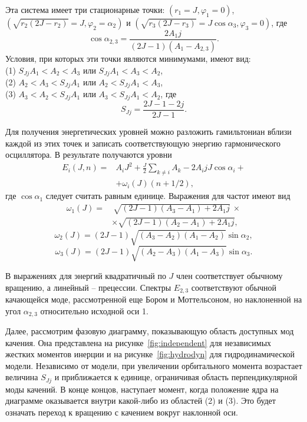 \documentclass[a4paper, 10pt, twocolumn]{article}
\let\phi\varphi
\begin{document}
Эта система имеет три стационарные точки: $(r_1 = J, \phi_1 = 0)$,
$(\sqrt{r_2(2J - r_2)} = J, \phi_2 = \alpha_2)$
и $(\sqrt{r_3(2J-r_3)} = J\cos\alpha_3, \phi_3 = 0)$, где
$$\cos\alpha_{2,3} = \frac{2A_1j}{(2J-1)(A_1 - A_{2,3})}.$$
Условия, при которых эти точки являются минимумами, имеют вид:
\def\SJj{S_{Jj}}
\\ (1) $\SJj A_1 < A_2 < A_3$ или $\SJj A_1 < A_3 < A_2$,
\\ (2) $A_2 < A_3 < \SJj A_1$ или $A_2 < \SJj A_1 < A_3$,
\\ (3) $A_3 < A_2 < \SJj A_1$ или $A_3 < \SJj A_1 < A_2$,
где
$$ \SJj = \frac{2J - 1 - 2j}{2J - 1}.$$

Для получения энергетических уровней можно разложить гамильтониан вблизи 
каждой из этих точек и записать соответствующую энергию гармонического 
осциллятора. В результате получаются уровни
$$\begin{aligned}
	E_i(J, n) =& A_i J^2 + \frac{J}{2}\sum_{k\neq i} A_k - 2A_i jJ \cos\alpha_i + \\
	& + \omega_i(J) (n + 1/2),
\end{aligned}$$
где $\cos\alpha_1$ следует считать равным единице. Выражения для частот 
имеют вид
$$\begin{aligned}
	\omega_1(J) =&\ \sqrt{(2J - 1)(A_3 - A_1) + 2A_1j}\ \times \\
	& \times \sqrt{(2J - 1)(A_2 - A_1) + 2A_1 j},
\end{aligned}$$
$$ \omega_2(J) = (2J-1)\sqrt{(A_3 - A_2)(A_1 - A_2)}\sin\alpha_2, $$
$$ \omega_3(J) = (2J-1)\sqrt{(A_2 - A_3)(A_1 - A_3)}\sin\alpha_3. $$

В выражениях для энергий квадратичный по $J$ член соответствует обычному 
вращению, а линейный -- прецессии. Спектры $E_{2,3}$ соответствуют 
обычной качающейся моде, рассмотренной еще Бором и Моттельсоном, но 
наклоненной на угол $\alpha_{2,3}$ относительно исходной оси 1.

Далее, рассмотрим фазовую диаграмму, показывающую область доступных мод 
качения. Она представлена на рисунке~\ref{fig:independent} для 
независимых жестких моментов инерции и на рисунке~\ref{fig:hydrodyn} для 
гидродинамической модели. Независимо от модели, при увеличении 
орбитального момента возрастает величина $\SJj$ и приближается 
к единице, ограничивая область перпендикулярной моды качений. В конце 
концов, наступает момент, когда положение ядра на диаграмме оказывается 
внутри какой-либо из областей (2) и (3). Это будет означать переход 
к вращению с качением вокруг наклонной оси.
\end{document}
